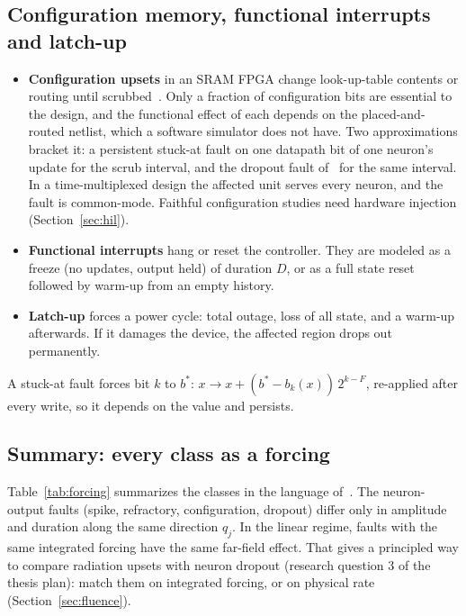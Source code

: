 \documentclass[11pt,a4paper]{article}
\begin{document}
\subsection{Configuration memory, functional interrupts and latch-up}
\label{sec:config}

\begin{itemize}
  \item \textbf{Configuration upsets} in an SRAM FPGA change look-up-table contents or routing until scrubbed~\cite{quinn2005,amd_sem}. Only a fraction of configuration bits are essential to the design, and the functional effect of each depends on the placed-and-routed netlist, which a software simulator does not have. Two approximations bracket it: a persistent stuck-at fault on one datapath bit of one neuron's update for the scrub interval, and the dropout fault of~\cite{dropout2026} for the same interval. In a time-multiplexed design the affected unit serves every neuron, and the fault is common-mode. Faithful configuration studies need hardware injection (Section~\ref{sec:hil}).
  \item \textbf{Functional interrupts} hang or reset the controller. They are modeled as a freeze (no updates, output held) of duration $D$, or as a full state reset followed by warm-up from an empty history.
  \item \textbf{Latch-up} forces a power cycle: total outage, loss of all state, and a warm-up afterwards. If it damages the device, the affected region drops out permanently.
\end{itemize}
A stuck-at fault forces bit $k$ to $b^{*}$: $x \to x + (b^{*} - b_k(x))\,2^{k-F}$, re-applied after every write, so it depends on the value and persists.

\subsection{Summary: every class as a forcing}

Table~\ref{tab:forcing} summarizes the classes in the language of~\cite{dropout2026}. The neuron-output faults (spike, refractory, configuration, dropout) differ only in amplitude and duration along the same direction $q_j$. In the linear regime, faults with the same integrated forcing have the same far-field effect. That gives a principled way to compare radiation upsets with neuron dropout (research question 3 of the thesis plan): match them on integrated forcing, or on physical rate (Section~\ref{sec:fluence}).
\end{document}

